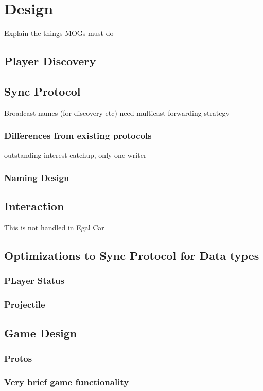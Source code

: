 \chapter{Design}
Explain the things MOGs must do 

\section{Player Discovery}

\section{Sync Protocol}
Broadcast names (for discovery etc) need multicast forwarding strategy
\subsection{Differences from existing protocols}
outstanding interest catchup, only one writer
\subsection{Naming Design}

\section{Interaction}
This is not handled in Egal Car

\section{Optimizations to Sync Protocol for Data types}
\subsection{PLayer Status}
\subsection{Projectile}

\section{Game Design}
\subsection{Protos}
\subsection{Very brief game functionality}
